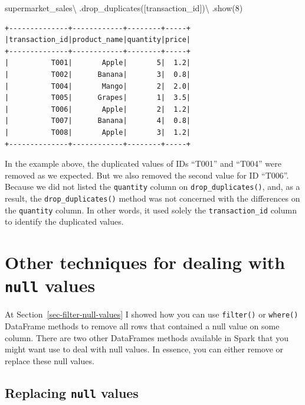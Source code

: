 \documentclass[
  11pt,
  letterpaper,
  DIV=11,
  numbers=noendperiod]{scrreprt}
\newenvironment{Shaded}{\begin{snugshade}}{\end{snugshade}}
\newcommand{\DecValTok}[1]{\textcolor[rgb]{0.68,0.00,0.00}{#1}}
\newcommand{\NormalTok}[1]{\textcolor[rgb]{0.00,0.23,0.31}{#1}}
\newcommand{\OperatorTok}[1]{\textcolor[rgb]{0.37,0.37,0.37}{#1}}
\newcommand{\StringTok}[1]{\textcolor[rgb]{0.13,0.47,0.30}{#1}}
\begin{document}
\begin{Shaded}
\begin{Highlighting}[]
\NormalTok{supermarket\_sales}\OperatorTok{\textbackslash{}}
\NormalTok{    .drop\_duplicates([}\StringTok{\textquotesingle{}transaction\_id\textquotesingle{}}\NormalTok{])}\OperatorTok{\textbackslash{}}
\NormalTok{    .show(}\DecValTok{8}\NormalTok{)}
\end{Highlighting}
\end{Shaded}

\begin{verbatim}
+--------------+------------+--------+-----+
|transaction_id|product_name|quantity|price|
+--------------+------------+--------+-----+
|          T001|       Apple|       5|  1.2|
|          T002|      Banana|       3|  0.8|
|          T004|       Mango|       2|  2.0|
|          T005|      Grapes|       1|  3.5|
|          T006|       Apple|       2|  1.2|
|          T007|      Banana|       4|  0.8|
|          T008|       Apple|       3|  1.2|
+--------------+------------+--------+-----+
\end{verbatim}

In the example above, the duplicated values of IDs ``T001'' and ``T004''
were removed as we expected. But we also removed the second value for ID
``T006''. Because we did not listed the \texttt{quantity} column on
\texttt{drop\_duplicates()}, and, as a result, the
\texttt{drop\_duplicates()} method was not concerned with the
differences on the \texttt{quantity} column. In other words, it used
solely the \texttt{transaction\_id} column to identify the duplicated
values.

\hypertarget{other-techniques-for-dealing-with-null-values}{%
\section{\texorpdfstring{Other techniques for dealing with \texttt{null}
values}{Other techniques for dealing with null values}}\label{other-techniques-for-dealing-with-null-values}}

At Section~\ref{sec-filter-null-values} I showed how you can use
\texttt{filter()} or \texttt{where()} DataFrame methods to remove all
rows that contained a null value on some column. There are two other
DataFrames methods available in Spark that you might want use to deal
with null values. In essence, you can either remove or replace these
null values.

\hypertarget{replacing-null-values}{%
\subsection{\texorpdfstring{Replacing \texttt{null}
values}{Replacing null values}}\label{replacing-null-values}}
\end{document}
